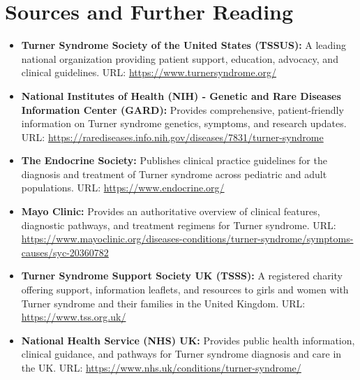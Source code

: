 \section*{Sources and Further Reading}
\begin{itemize}
    \item \textbf{Turner Syndrome Society of the United States (TSSUS):} A leading national organization providing patient support, education, advocacy, and clinical guidelines. URL: \href{https://www.turnersyndrome.org/}{https://www.turnersyndrome.org/}
    \item \textbf{National Institutes of Health (NIH) - Genetic and Rare Diseases Information Center (GARD):} Provides comprehensive, patient-friendly information on Turner syndrome genetics, symptoms, and research updates. URL: \href{https://rarediseases.info.nih.gov/diseases/7831/turner-syndrome}{https://rarediseases.info.nih.gov/diseases/7831/turner-syndrome}
    \item \textbf{The Endocrine Society:} Publishes clinical practice guidelines for the diagnosis and treatment of Turner syndrome across pediatric and adult populations. URL: \href{https://www.endocrine.org/}{https://www.endocrine.org/}
    \item \textbf{Mayo Clinic:} Provides an authoritative overview of clinical features, diagnostic pathways, and treatment regimens for Turner syndrome. URL: \href{https://www.mayoclinic.org/diseases-conditions/turner-syndrome/symptoms-causes/syc-20360782}{https://www.mayoclinic.org/diseases-conditions/turner-syndrome/symptoms-causes/syc-20360782}
    \item \textbf{Turner Syndrome Support Society UK (TSSS):} A registered charity offering support, information leaflets, and resources to girls and women with Turner syndrome and their families in the United Kingdom. URL: \href{https://www.tss.org.uk/}{https://www.tss.org.uk/}
    \item \textbf{National Health Service (NHS) UK:} Provides public health information, clinical guidance, and pathways for Turner syndrome diagnosis and care in the UK. URL: \href{https://www.nhs.uk/conditions/turner-syndrome/}{https://www.nhs.uk/conditions/turner-syndrome/}
\end{itemize}
